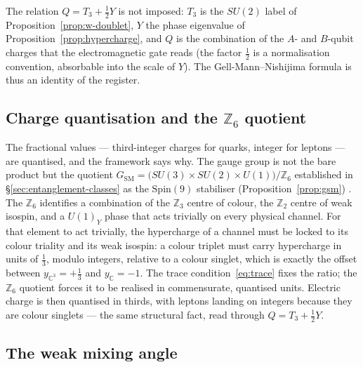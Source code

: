 The relation $Q = T_3 + \tfrac12 Y$ is not imposed: $T_3$ is the $SU(2)$ label of
Proposition~\ref{prop:w-doublet}, $Y$ the phase eigenvalue of Proposition~\ref{prop:hypercharge},
and $Q$ is the combination of the $A$- and $B$-qubit charges that the electromagnetic gate reads
(the factor $\tfrac12$ is a normalisation convention, absorbable into the scale of $Y$).
The Gell-Mann--Nishijima formula is thus an identity of the register.

\subsection{Charge quantisation and the \texorpdfstring{$\mathbb{Z}_6$}{Z6} quotient}

The fractional values --- third-integer charges for quarks, integer for leptons --- are quantised,
and the framework says why. The gauge group is not the bare product but the quotient
$G_{\mathrm{SM}} = \bigl(SU(3)\times SU(2)\times U(1)\bigr)/\mathbb{Z}_6$ established in
\S\ref{sec:entanglement-classes} as the $\mathrm{Spin}(9)$ stabiliser
(Proposition~\ref{prop:gsm}) \autocite{krasnov2021so9}. The $\mathbb{Z}_6$ identifies a combination
of the $\mathbb{Z}_3$ centre of colour, the $\mathbb{Z}_2$ centre of weak isospin, and a $U(1)_Y$
phase that acts trivially on every physical channel. For that element to act trivially, the
hypercharge of a channel must be locked to its colour triality and its weak isospin: a colour
triplet must carry hypercharge in units of $\tfrac13$, modulo integers, relative to a colour
singlet, which is exactly the offset between $y_{\mathbb{C}^3} = +\tfrac13$ and
$y_{\mathbb{C}} = -1$. The trace
condition~\eqref{eq:trace} fixes the ratio; the $\mathbb{Z}_6$ quotient forces it to be realised in
commensurate, quantised units. Electric charge is then quantised in thirds, with leptons landing on
integers because they are colour singlets --- the same structural fact, read through $Q = T_3 +
\tfrac12 Y$.

\subsection{The weak mixing angle}

